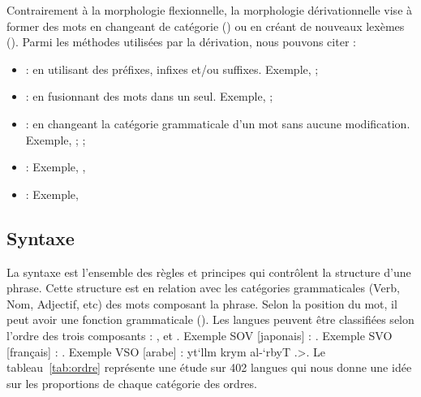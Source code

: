 \documentclass{KodeBook}
\begin{document}
Contrairement à la morphologie flexionnelle, la morphologie dérivationnelle vise à former des mots en changeant de catégorie () ou en créant de nouveaux lexèmes (). 
Parmi les méthodes utilisées par la dérivation, nous pouvons citer :
\begin{itemize}
	\item {} : en utilisant des préfixes, infixes et/ou suffixes. 
	Exemple, ; 
	
	\item {} : en fusionnant des mots dans un seul. 
	Exemple, ; 
	
	\item {} : en changeant la catégorie grammaticale d'un mot sans aucune modification. 
	Exemple, ; ; 
	
	\item {} : 
	Exemple, , 
	
	\item {} : Exemple,  
	
\end{itemize}

\subsection{Syntaxe}

La syntaxe est l'ensemble des règles et principes qui contrôlent la structure d'une phrase. 
Cette structure est en relation avec les catégories grammaticales (Verb, Nom, Adjectif, etc) des mots composant la phrase.
Selon la position du mot, il peut avoir une fonction grammaticale ().
Les langues peuvent être classifiées selon l'ordre des trois composants : ,  et .
Exemple SOV [japonais] : .
Exemple SVO [français] : .
Exemple VSO [arabe] : \<yt`llm \LR{[V]} krym \LR{[S]} al-`rbyT \LR{[O]}.>.
Le tableau~\ref{tab:ordre} représente une étude sur 402 langues qui nous donne une idée sur les proportions de chaque catégorie des ordres.
\end{document}
